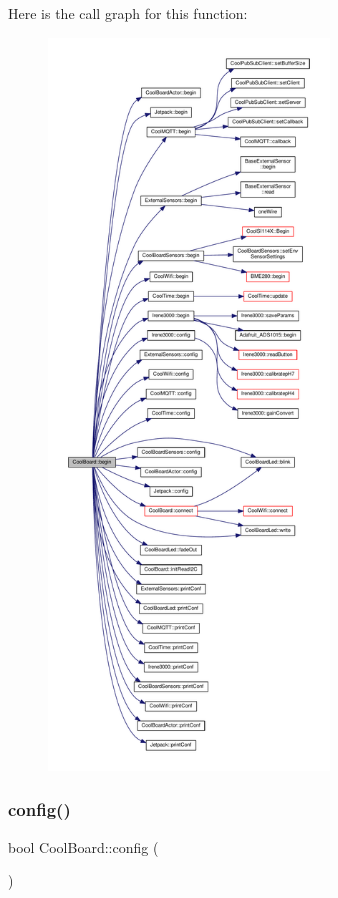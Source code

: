 Here is the call graph for this function\+:\nopagebreak
\begin{figure}[H]
\begin{center}
\leavevmode
\includegraphics[height=550pt]{d7/df9/class_cool_board_acba7c5aef7268b2c0044bdb54d3b9d76_cgraph}
\end{center}
\end{figure}
\mbox{\label{class_cool_board_a583a874c09c07e70a6eb9229fc4beddb}} 
\subsubsection{\texorpdfstring{config()}{config()}}
{\footnotesize\ttfamily bool Cool\+Board\+::config (\begin{DoxyParamCaption}{ }\end{DoxyParamCaption})}

